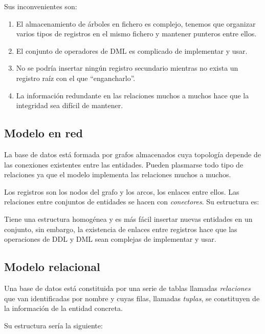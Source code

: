 \documentclass[10pt,a4paper,spanish]{report}
\begin{document}


Sus inconvenientes son:
\begin{enumerate}[$\heartsuit$]
    \item El almacenamiento de árboles en fichero es complejo, tenemos que organizar varios tipos de registros en el mismo fichero y mantener punteros entre ellos.
    \item El conjunto de operadores de DML es complicado de implementar y usar.
    \item No se podría insertar ningún registro secundario mientras no exista un registro raíz con el que ``engancharlo''.
    \item La información redundante en las relaciones muchos a muchos hace que la integridad sea difícil de mantener.
\end{enumerate}

\textcolor[rgb]{1,0.2,0.3}{\section{Modelo en red}}
La base de datos está formada por grafos almacenados cuya topología depende de las conexiones existentes entre las entidades. Pueden plasmarse todo tipo de relaciones ya que el modelo implementa las relaciones muchos a muchos.

Los registros son los nodos del grafo y los arcos, los enlaces entre ellos. Las relaciones entre conjuntos de entidades se hacen con \textit{\textcolor[rgb]{1,0.2,0.3}{conectores}}. Su estructura es:



Tiene una estructura homogénea y es más fácil insertar nuevas entidades en un conjunto, sin embargo, la existencia de enlaces entre registros hace que las operaciones de DDL y DML sean complejas de implementar y usar.

\textcolor[rgb]{1,0.2,0.3}{\section{Modelo relacional}}
Una base de datos está constituida por una serie de tablas llamadas \textit{\textcolor[rgb]{1,0.2,0.3}{relaciones}} que van identificadas por nombre y cuyas filas, llamadas \textcolor[rgb]{1,0.2,0.3}{\textit{tuplas}}, se constituyen de la información de la entidad concreta.

Su estructura sería la siguiente:


\end{document}

